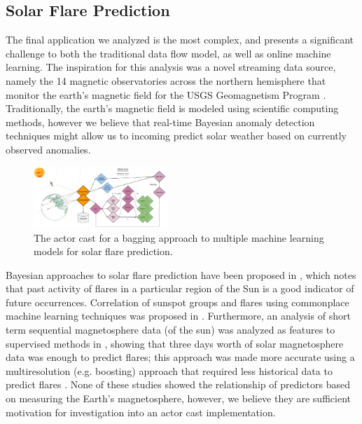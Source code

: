 \documentclass[conference,twocolumn,11pt]{IEEEtran}
\begin{document}
\subsection{Solar Flare Prediction}

The final application we analyzed is the most complex, and presents a significant challenge to both the traditional data flow model, as well as online machine learning. The inspiration for this analysis was a novel streaming data source, namely the 14 magnetic observatories across the northern hemisphere that monitor the earth's magnetic field for the USGS Geomagnetism Program \cite{love_usgs_2011}. Traditionally, the earth's magnetic field is modeled using scientific computing methods, however we believe that real-time Bayesian anomaly detection techniques \cite{hill_real-time_2007} might allow us to incoming predict solar weather based on currently observed anomalies.

\begin{figure}[!h]
    \centering
    \includegraphics[width=0.45\textwidth]{solar_cast}
    \caption{The actor cast for a bagging approach to multiple machine learning models for solar flare prediction.}
    \label{fig:solar_cast}
\end{figure}

Bayesian approaches to solar flare prediction have been proposed in \cite{wheatland_bayesian_2004}, which notes that past activity of flares in a particular region of the Sun is a good indicator of future occurrences. Correlation of sunspot groups and flares using commonplace machine learning techniques was proposed in \cite{qahwaji_automatic_2007}. Furthermore, an analysis of short term sequential magnetosphere data (of the sun) was analyzed as features to supervised methods in \cite{yu_short-term_2009}, showing that three days worth of solar magnetosphere data was enough to predict flares; this approach was made more accurate using a multiresolution (e.g. boosting) approach that required less historical data to predict flares \cite{yu_short-term_2010}. None of these studies showed the relationship of predictors based on measuring the Earth's magnetosphere, however, we believe they are sufficient motivation for investigation into an actor cast implementation.
\end{document}
